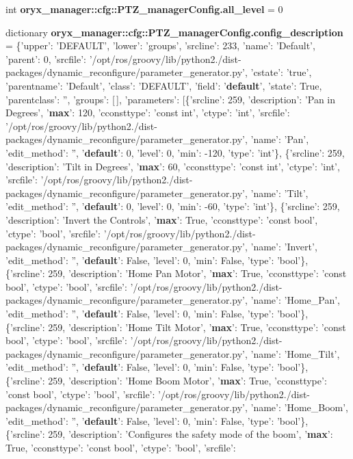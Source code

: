 \begin{DoxyCompactItemize}
\item 
int {\bf oryx\-\_\-manager\-::cfg\-::\-P\-T\-Z\-\_\-manager\-Config.\-all\-\_\-level} = 0
\item 
dictionary {\bf oryx\-\_\-manager\-::cfg\-::\-P\-T\-Z\-\_\-manager\-Config.\-config\-\_\-description} = \{'upper'\-: '\-D\-E\-F\-A\-U\-L\-T', 'lower'\-: 'groups', 'srcline'\-: 233, 'name'\-: '\-Default', 'parent'\-: 0, 'srcfile'\-: '/opt/ros/groovy/lib/python2./dist-\/packages/dynamic\-\_\-reconfigure/parameter\-\_\-generator.\-py', 'cstate'\-: 'true', 'parentname'\-: '\-Default', 'class'\-: '\-D\-E\-F\-A\-U\-L\-T', 'field'\-: '{\bf default}', 'state'\-: \-True, 'parentclass'\-: '', 'groups'\-: [$\,$], 'parameters'\-: [\{'srcline'\-: 259, 'description'\-: '\-Pan in \-Degrees', '{\bf max}'\-: 120, 'cconsttype'\-: 'const int', 'ctype'\-: 'int', 'srcfile'\-: '/opt/ros/groovy/lib/python2./dist-\/packages/dynamic\-\_\-reconfigure/parameter\-\_\-generator.\-py', 'name'\-: '\-Pan', 'edit\-\_\-method'\-: '', '{\bf default}'\-: 0, 'level'\-: 0, 'min'\-: -\/120, 'type'\-: 'int'\}, \{'srcline'\-: 259, 'description'\-: '\-Tilt in \-Degrees', '{\bf max}'\-: 60, 'cconsttype'\-: 'const int', 'ctype'\-: 'int', 'srcfile'\-: '/opt/ros/groovy/lib/python2./dist-\/packages/dynamic\-\_\-reconfigure/parameter\-\_\-generator.\-py', 'name'\-: '\-Tilt', 'edit\-\_\-method'\-: '', '{\bf default}'\-: 0, 'level'\-: 0, 'min'\-: -\/60, 'type'\-: 'int'\}, \{'srcline'\-: 259, 'description'\-: '\-Invert the \-Controls', '{\bf max}'\-: \-True, 'cconsttype'\-: 'const bool', 'ctype'\-: 'bool', 'srcfile'\-: '/opt/ros/groovy/lib/python2./dist-\/packages/dynamic\-\_\-reconfigure/parameter\-\_\-generator.\-py', 'name'\-: '\-Invert', 'edit\-\_\-method'\-: '', '{\bf default}'\-: \-False, 'level'\-: 0, 'min'\-: \-False, 'type'\-: 'bool'\}, \{'srcline'\-: 259, 'description'\-: '\-Home \-Pan \-Motor', '{\bf max}'\-: \-True, 'cconsttype'\-: 'const bool', 'ctype'\-: 'bool', 'srcfile'\-: '/opt/ros/groovy/lib/python2./dist-\/packages/dynamic\-\_\-reconfigure/parameter\-\_\-generator.\-py', 'name'\-: '\-Home\-\_\-\-Pan', 'edit\-\_\-method'\-: '', '{\bf default}'\-: \-False, 'level'\-: 0, 'min'\-: \-False, 'type'\-: 'bool'\}, \{'srcline'\-: 259, 'description'\-: '\-Home \-Tilt \-Motor', '{\bf max}'\-: \-True, 'cconsttype'\-: 'const bool', 'ctype'\-: 'bool', 'srcfile'\-: '/opt/ros/groovy/lib/python2./dist-\/packages/dynamic\-\_\-reconfigure/parameter\-\_\-generator.\-py', 'name'\-: '\-Home\-\_\-\-Tilt', 'edit\-\_\-method'\-: '', '{\bf default}'\-: \-False, 'level'\-: 0, 'min'\-: \-False, 'type'\-: 'bool'\}, \{'srcline'\-: 259, 'description'\-: '\-Home \-Boom \-Motor', '{\bf max}'\-: \-True, 'cconsttype'\-: 'const bool', 'ctype'\-: 'bool', 'srcfile'\-: '/opt/ros/groovy/lib/python2./dist-\/packages/dynamic\-\_\-reconfigure/parameter\-\_\-generator.\-py', 'name'\-: '\-Home\-\_\-\-Boom', 'edit\-\_\-method'\-: '', '{\bf default}'\-: \-False, 'level'\-: 0, 'min'\-: \-False, 'type'\-: 'bool'\}, \{'srcline'\-: 259, 'description'\-: '\-Configures the safety mode of the boom', '{\bf max}'\-: \-True, 'cconsttype'\-: 'const bool', 'ctype'\-: 'bool', 'srcfile'\-: 
\end{DoxyCompactItemize}
